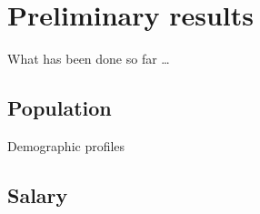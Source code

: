\documentclass[12pt]{beamer}
\begin{document}
\section{Preliminary results}


\begin{frame}
	\centerline{\Huge\textcolor{bscuro}{What has been done so far \ldots}}		
\end{frame}


\subsection{Population}


\begin{frame}{\textcolor{bscuro}{Demographic profiles}}
	\begin{figure}[!ht] 
		\centering
	\end{figure}
\end{frame}


\subsection{Salary}
\end{document}

